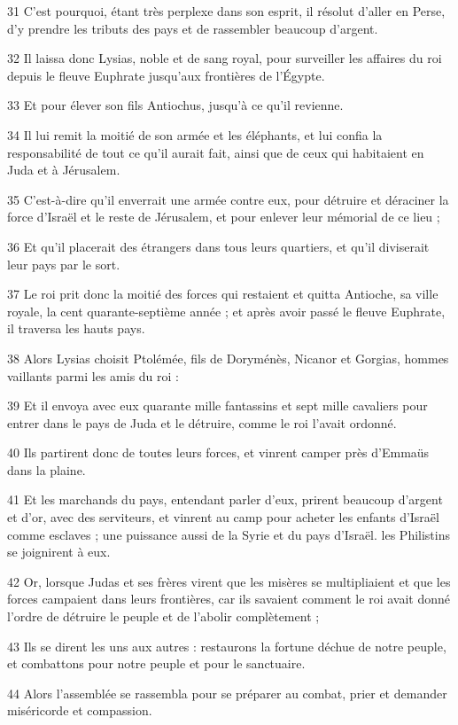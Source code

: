 \par 31 C'est pourquoi, étant très perplexe dans son esprit, il résolut d'aller en Perse, d'y prendre les tributs des pays et de rassembler beaucoup d'argent.
\par 32 Il laissa donc Lysias, noble et de sang royal, pour surveiller les affaires du roi depuis le fleuve Euphrate jusqu'aux frontières de l'Égypte.
\par 33 Et pour élever son fils Antiochus, jusqu'à ce qu'il revienne.
\par 34 Il lui remit la moitié de son armée et les éléphants, et lui confia la responsabilité de tout ce qu'il aurait fait, ainsi que de ceux qui habitaient en Juda et à Jérusalem.
\par 35 C'est-à-dire qu'il enverrait une armée contre eux, pour détruire et déraciner la force d'Israël et le reste de Jérusalem, et pour enlever leur mémorial de ce lieu ;
\par 36 Et qu'il placerait des étrangers dans tous leurs quartiers, et qu'il diviserait leur pays par le sort.
\par 37 Le roi prit donc la moitié des forces qui restaient et quitta Antioche, sa ville royale, la cent quarante-septième année ; et après avoir passé le fleuve Euphrate, il traversa les hauts pays.
\par 38 Alors Lysias choisit Ptolémée, fils de Doryménès, Nicanor et Gorgias, hommes vaillants parmi les amis du roi :
\par 39 Et il envoya avec eux quarante mille fantassins et sept mille cavaliers pour entrer dans le pays de Juda et le détruire, comme le roi l'avait ordonné.
\par 40 Ils partirent donc de toutes leurs forces, et vinrent camper près d'Emmaüs dans la plaine.
\par 41 Et les marchands du pays, entendant parler d'eux, prirent beaucoup d'argent et d'or, avec des serviteurs, et vinrent au camp pour acheter les enfants d'Israël comme esclaves ; une puissance aussi de la Syrie et du pays d'Israël. les Philistins se joignirent à eux.
\par 42 Or, lorsque Judas et ses frères virent que les misères se multipliaient et que les forces campaient dans leurs frontières, car ils savaient comment le roi avait donné l'ordre de détruire le peuple et de l'abolir complètement ;
\par 43 Ils se dirent les uns aux autres : restaurons la fortune déchue de notre peuple, et combattons pour notre peuple et pour le sanctuaire.
\par 44 Alors l'assemblée se rassembla pour se préparer au combat, prier et demander miséricorde et compassion.
